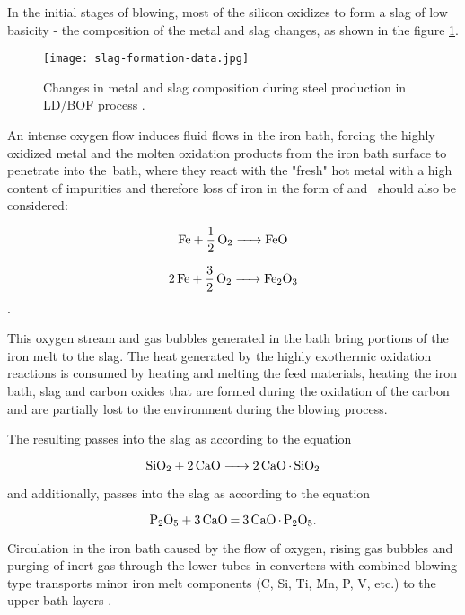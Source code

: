 In the initial stages of blowing, most of the silicon oxidizes to form a slag of low basicity - the composition of the metal and slag changes, as shown in the figure \ref{o:20}.

\begin{figure}[h!]
	\centering
	\texttt{[image: slag-formation-data.jpg]}
	\caption{Changes in metal and slag composition during steel production in LD/BOF process \citep{Turkdogan1996}.}
	\label{o:20}
\end{figure}

An intense oxygen flow induces fluid flows in the iron bath, forcing the highly oxidized metal and the molten oxidation products from the iron bath surface to penetrate into the~bath, where they react with the "fresh" hot metal with a high content of impurities and therefore loss of iron in the form of  and~ should also be considered:

\begin{equation}
\ce{Fe + 1/2O2 -> FeO}
\end{equation}

\begin{equation}
\ce{2Fe + 3/2O2 -> Fe2O3}
\end{equation}.

This oxygen stream and gas bubbles generated in the bath bring portions of the iron melt to the slag. The heat generated by the highly exothermic oxidation reactions is consumed by heating and melting the feed materials, heating the iron bath, slag and carbon oxides that are formed during the oxidation of the carbon and are partially lost to the environment during the blowing process.

The resulting  passes into the slag as  according to the equation

\begin{equation}
\ce{SiO2 + 2CaO -> 2CaO.SiO2}
\end{equation}

and additionally,  passes into the slag as  according to the equation \citep{sprava2017}

\begin{equation}
\ce{P2O5 + 3CaO = 3CaO.P2O5}.
\end{equation}

Circulation in the iron bath caused by the flow of oxygen, rising gas bubbles and purging of inert gas through the lower tubes in converters with combined blowing type transports minor iron melt components (C, Si, Ti, Mn, P, V, etc.) to the upper bath layers \citep{Jalkanen2006}. 

